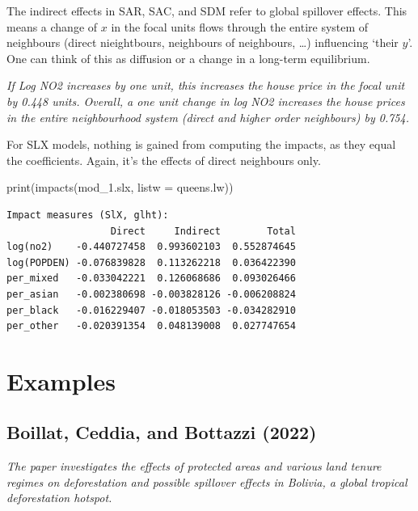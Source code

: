 \documentclass[
  letterpaper,
  DIV=11,
  numbers=noendperiod]{scrreprt}
\newenvironment{Shaded}{\begin{snugshade}}{\end{snugshade}}
\newcommand{\AttributeTok}[1]{\textcolor[rgb]{0.40,0.45,0.13}{#1}}
\newcommand{\FunctionTok}[1]{\textcolor[rgb]{0.28,0.35,0.67}{#1}}
\newcommand{\NormalTok}[1]{\textcolor[rgb]{0.00,0.23,0.31}{#1}}
\begin{document}
The indirect effects in SAR, SAC, and SDM refer to global spillover
effects. This means a change of \(x\) in the focal units flows through
the entire system of neighbours (direct nieightbours, neighbours of
neighbours, \ldots) influencing `their \(y\)'. One can think of this as
diffusion or a change in a long-term equilibrium.

\emph{If Log NO2 increases by one unit, this increases the house price
in the focal unit by 0.448 units. Overall, a one unit change in log NO2
increases the house prices in the entire neighbourhood system (direct
and higher order neighbours) by 0.754.}

For SLX models, nothing is gained from computing the impacts, as they
equal the coefficients. Again, it's the effects of direct neighbours
only.

\begin{Shaded}
\begin{Highlighting}[]
\FunctionTok{print}\NormalTok{(}\FunctionTok{impacts}\NormalTok{(mod\_1.slx, }\AttributeTok{listw =}\NormalTok{ queens.lw))}
\end{Highlighting}
\end{Shaded}

\begin{verbatim}
Impact measures (SlX, glht):
                  Direct     Indirect        Total
log(no2)    -0.440727458  0.993602103  0.552874645
log(POPDEN) -0.076839828  0.113262218  0.036422390
per_mixed   -0.033042221  0.126068686  0.093026466
per_asian   -0.002380698 -0.003828126 -0.006208824
per_black   -0.016229407 -0.018053503 -0.034282910
per_other   -0.020391354  0.048139008  0.027747654
\end{verbatim}

\hypertarget{examples}{%
\section{Examples}\label{examples}}

\hypertarget{boillat.2022}{%
\subsection*{Boillat, Ceddia, and Bottazzi (2022)}\label{boillat.2022}}

\emph{The paper investigates the effects of protected areas and various
land tenure regimes on deforestation and possible spillover effects in
Bolivia, a global tropical deforestation hotspot.}
\end{document}
